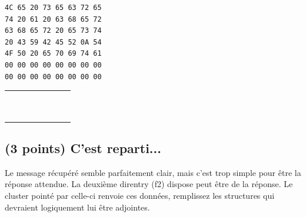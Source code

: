 \documentclass[11pt,a4paper]{article}
\begin{document}
\begin{table}[ht!]
  \centering
  \begin{minipage}{0.4\textwidth}
    \centering
\begin{lstlisting}[style=algorithmique]
4C 65 20 73 65 63 72 65
74 20 61 20 63 68 65 72
63 68 65 72 20 65 73 74
20 43 59 42 45 52 0A 54
4F 50 20 65 70 69 74 61
00 00 00 00 00 00 00 00
00 00 00 00 00 00 00 00
\end{lstlisting}
  \end{minipage}
  \hfillx
  \begin{minipage}{0.45\textwidth}
    \centering

%
%
%
%
%
%
%

\begin{tabular}{ | m{0.45cm} | m{0.45cm} | m{0.45cm} | m{0.45cm}   |   m{0.45cm} | m{0.45cm} | m{0.45cm} | m{0.45cm} | }
\hline
 & & &   &   & & & \\
 & & &   &   & & & \\
\hline
 & & &   &   & & & \\
 & & &   &   & & & \\
\hline
 & & &   &   & & & \\
 & & &   &   & & & \\
\hline
 & & &   &   & & & \\
 & & &   &   & & & \\
\hline
 & & &   &   & & & \\
 & & &   &   & & & \\
\hline
\end{tabular}

  \end{minipage}
\end{table}




\subsection{(3 points) C'est reparti... }

Le message récupéré semble parfaitement clair, mais c'est trop simple pour être la réponse attendue.
La deuxième direntry (f2) dispose peut être de la réponse.
Le cluster pointé par celle-ci renvoie ces données, remplissez les structures qui devraient logiquement lui être adjointes.
\end{document}
